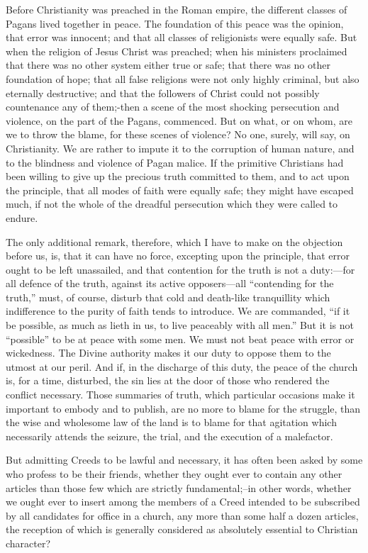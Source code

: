 \documentclass[
]{book}
\begin{document}
Before Christianity was preached in the Roman empire, the different classes of Pagans lived together in peace. The foundation of this peace was the opinion, that error was innocent; and that all classes of religionists were equally safe. But when the religion of Jesus Christ was preached; when his ministers proclaimed that there was no other system either true or safe; that there was no other foundation of hope; that all false religions were not only highly criminal, but also eternally destructive; and that the followers of Christ could not possibly countenance any of them;-then a scene of the most shocking persecution and violence, on the part of the Pagans, commenced. But on what, or on whom, are we to throw the blame, for these scenes of violence? No one, surely, will say, on Christianity. We are rather to impute it to the corruption of human nature, and to the blindness and violence of Pagan malice. If the primitive Christians had been willing to give up the precious truth committed to them, and to act upon the principle, that all modes of faith were equally safe; they might have escaped much, if not the whole of the dreadful persecution which they were called to endure.

The only additional remark, therefore, which I have to make on the objection before us, is, that it can have no force, excepting upon the principle, that error ought to be left unassailed, and that contention for the truth is not a duty:---for all defence of the truth, against its active opposers---all ``contending for the truth,'' must, of course, disturb that cold and death-like tranquillity which indifference to the purity of faith tends to introduce. We are commanded, ``if it be possible, as much as lieth in us, to live peaceably with all men.'' But it is not ``possible'' to be at peace with some men. We must not beat peace with error or wickedness. The Divine authority makes it our duty to oppose them to the utmost at our peril. And if, in the discharge of this duty, the peace of the church is, for a time, disturbed, the sin lies at the door of those who rendered the conflict necessary. Those summaries of truth, which particular occasions make it important to embody and to publish, are no more to blame for the struggle, than the wise and wholesome law of the land is to blame for that agitation which necessarily attends the seizure, the trial, and the execution of a malefactor.

But admitting Creeds to be lawful and necessary, it has often been asked by some who profess to be their friends, whether they ought ever to contain any other articles than those few which are strictly fundamental;--in other words, whether we ought ever to insert among the members of a Creed intended to be subscribed by all candidates for office in a church, any more than some half a dozen articles, the reception of which is generally considered as absolutely essential to Christian character?
\end{document}
